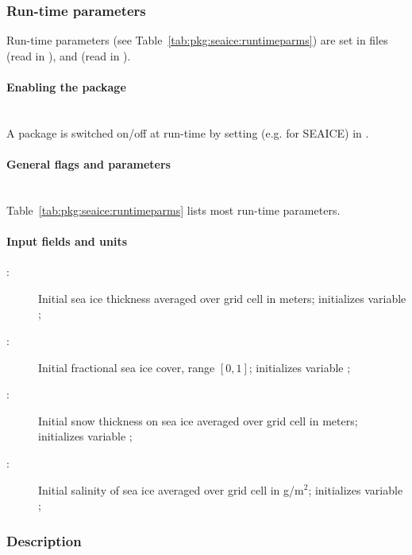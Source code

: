 
\subsubsection{Run-time parameters
\label{sec:pkg:seaice:runtime}}

Run-time parameters (see Table~\ref{tab:pkg:seaice:runtimeparms}) are set
in files  (read in ), and
 (read in ).

\paragraph{Enabling the package}
~ \\
%
A package is switched on/off at run-time by setting
(e.g. for SEAICE)  in .

\paragraph{General flags and parameters}
~ \\
%
Table~\ref{tab:pkg:seaice:runtimeparms} lists most run-time parameters.


\paragraph{Input fields and units\label{sec:pkg:seaice:fields_units}}
\begin{description}
\item[:] Initial sea ice thickness averaged over grid cell
  in meters; initializes variable ;
\item[:] Initial fractional sea ice cover, range $[0,1]$;
  initializes variable ;
\item[:] Initial snow thickness on sea ice averaged
  over grid cell in meters; initializes variable ;
\item[:] Initial salinity of sea ice averaged over grid
  cell in g/m$^2$; initializes variable ;
\end{description}

\subsubsection{Description
\label{sec:pkg:seaice:descr}}


